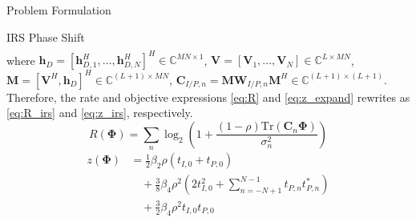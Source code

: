 \documentclass{IEEEtran}
\begin{document}
\begin{section}{Problem Formulation}
\begin{subsection}{IRS Phase Shift}
\begin{equation}
\begin{split}
			\end{split}
		\end{equation}
		where $\boldsymbol{h}_D=[\boldsymbol{h}_{D,1}^H,\dots,\boldsymbol{h}_{D,N}^H]^H \in \mathbb{C}^{MN \times 1}$, $\boldsymbol{V}=[\boldsymbol{V}_1,\dots,\boldsymbol{V}_N] \in \mathbb{C}^{L \times MN}$, $\boldsymbol{M}=[\boldsymbol{V}^H, \boldsymbol{h}_{D}]^H \in \mathbb{C}^{(L+1) \times MN}$, $\boldsymbol{C}_{I/P,n}=\boldsymbol{M}\boldsymbol{W}_{I/P,n}\boldsymbol{M}^H \in \mathbb{C}^{(L+1)\times(L+1)}$. Therefore, the rate and objective expressions \ref{eq:R} and \ref{eq:z_expand} rewrites as \ref{eq:R_irs} and \ref{eq:z_irs}, respectively.
		\begin{equation}\label{eq:R_irs}
			R(\boldsymbol{\Phi}) = \sum_{n}{\log_2\left(1+\frac{(1-\rho)\mathrm{Tr}(\boldsymbol{C}_n\boldsymbol{\Phi})}{\sigma_n^2}\right)}
		\end{equation}
		\begin{equation}\label{eq:z_irs}
			\begin{split}
				z(\boldsymbol{\Phi})
				&=\frac{1}{2}{\beta_2}{\rho}(t_{I,0}+t_{P,0})\\
				&\quad+\frac{3}{8}{\beta_4}{\rho^2} \left(2t_{I,0}^2 + \sum_{n=-N+1}^{N-1}{t_{P,n}t_{P,n}^*}\right)\\
				&\quad+\frac{3}{2}{\beta_4}{\rho^2}t_{I,0}t_{P,0}
			\end{split}
		\end{equation}


\end{subsection}
\end{section}
\end{document}
